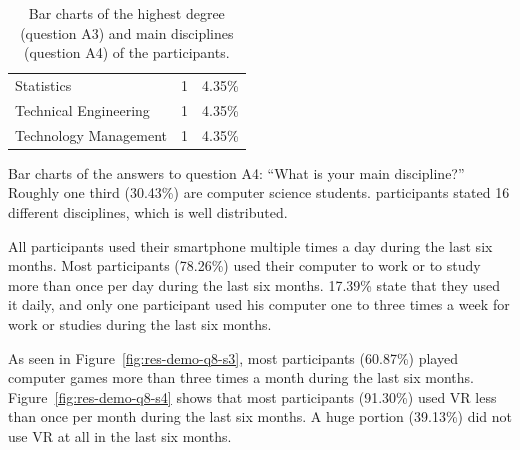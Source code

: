 \begin{table}[H]
\begin{subtable}{.5\linewidth}
\begin{tabular}{l c c}
			Statistics              & 1     & 4.35\%     \\
			Technical Engineering   & 1     & 4.35\%     \\
			Technology Management   & 1     & 4.35\%     \\
			\bottomrule
		\end{tabular}
		\caption{Bar charts of the answers to question A4: \enquote{What is your main discipline?} Roughly one third (30.43\%) are computer science students. \participantsCount{} participants stated 16 different disciplines, which is well distributed.}\label{tab:sus-discipline}
	\end{subtable}
	\caption[Degree and discipline of participants]{Bar charts of the highest degree (question A3) and main disciplines (question A4) of the participants.}\label{tab:sus-d}
\end{table}

All participants used their smartphone multiple times a day during the last six months. Most participants (78.26\%) used their computer to work or to study more than once per day during the last six months. 17.39\% state that they used it daily, and only one participant used his computer one to three times a week for work or studies during the last six months.

As seen in Figure~\ref{fig:res-demo-q8-s3}, most participants (60.87\%) played computer games more than three times a month during the last six months. Figure~\ref{fig:res-demo-q8-s4} shows that most participants (91.30\%) used \gls{VR} less than once per month during the last six months. A huge portion (39.13\%) did not use \gls{VR} at all in the last six months.

